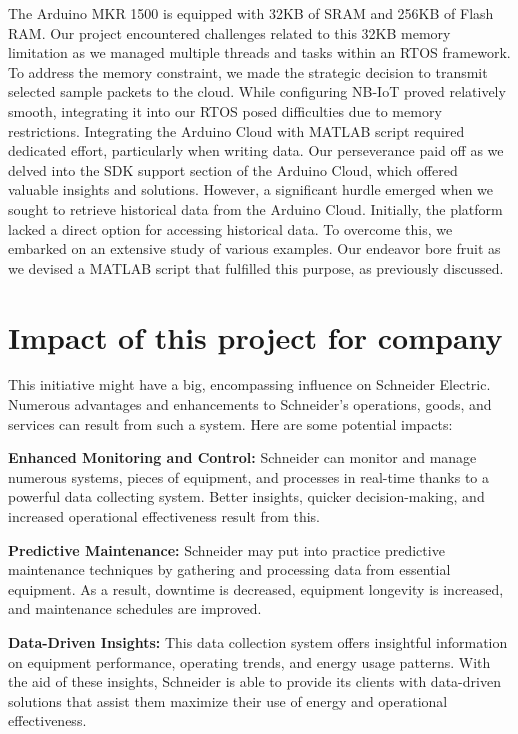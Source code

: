 The Arduino MKR 1500 is equipped with 32KB of SRAM and 256KB of Flash RAM. Our project encountered challenges related to this 32KB memory limitation as we managed multiple threads and tasks within an RTOS framework. To address the memory constraint, we made the strategic decision to transmit selected sample packets to the cloud. While configuring NB-IoT proved relatively smooth, integrating it into our RTOS posed difficulties due to memory restrictions. Integrating the Arduino Cloud with MATLAB script required dedicated effort, particularly when writing data. Our perseverance paid off as we delved into the SDK support section of the Arduino Cloud, which offered valuable insights and solutions. However, a significant hurdle emerged when we sought to retrieve historical data from the Arduino Cloud. Initially, the platform lacked a direct option for accessing historical data. To overcome this, we embarked on an extensive study of various examples. Our endeavor bore fruit as we devised a MATLAB script that fulfilled this purpose, as previously discussed.

\section{Impact of this project for company} 
This initiative might have a big, encompassing influence on Schneider Electric. Numerous advantages and enhancements to Schneider's operations, goods, and services can result from such a system. Here are some potential impacts:\par
\vspace{0.5cm}
\textbf{Enhanced Monitoring and Control: }Schneider can monitor and manage numerous systems, pieces of equipment, and processes in real-time thanks to a powerful data collecting system. Better insights, quicker decision-making, and increased operational effectiveness result from this.
\par

\textbf{Predictive Maintenance:} Schneider may put into practice predictive maintenance techniques by gathering and processing data from essential equipment. As a result, downtime is decreased, equipment longevity is increased, and maintenance schedules are improved.
\par

\textbf{Data-Driven Insights:} This data collection system offers insightful information on equipment performance, operating trends, and energy usage patterns. With the aid of these insights, Schneider is able to provide its clients with data-driven solutions that assist them maximize their use of energy and operational effectiveness.
\par

